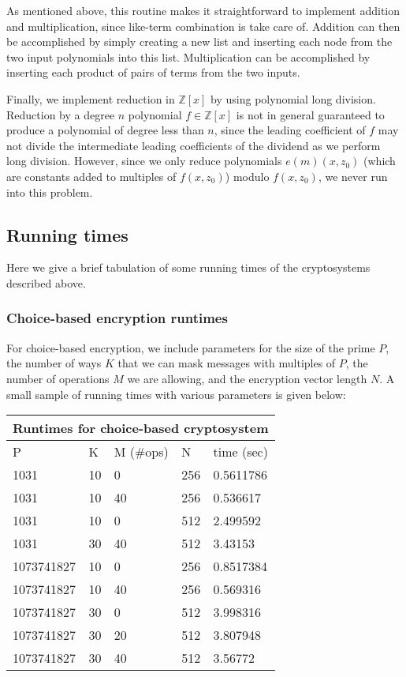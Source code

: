 \documentclass[11pt]{report}
\newcommand{\Zx}{\mathbb{Z}[x]}
\begin{document}
As mentioned above, this routine makes it straightforward to implement addition and multiplication, since like-term combination is take care of. Addition can then be accomplished by simply creating a new list and inserting each node from the two input polynomials into this list. Multiplication can be accomplished by inserting each product of pairs of terms from the two inputs.

Finally, we implement reduction in $\Zx$ by using polynomial long division. Reduction by a degree $n$ polynomial $f\in\Zx$ is not in general guaranteed to produce a polynomial of degree less than $n$, since the leading coefficient of $f$ may not divide the intermediate leading coefficients of the dividend as we perform long division. However, since we only reduce polynomials $e(m)(x,z_0)$ (which are constants added to multiples of $f(x,z_0)$) modulo $f(x,z_0)$, we never run into this problem.

\subsection{Running times}
Here we give a brief tabulation of some running times of the cryptosystems described above.

\subsubsection{Choice-based encryption runtimes} For choice-based encryption, we include parameters for the size of the prime $P$, the number of ways $K$ that we can mask messages with multiples of $P$, the number of operations $M$ we are allowing, and the encryption vector length $N$. A small sample of running times with various parameters is given below:

\begin{center}
\begin{tabular}{|l|l|l|l|l|}
\hline
\multicolumn{5}{|c|}{Runtimes for choice-based cryptosystem} \\
\hline
P & K & M (\#ops) & N & time (sec)\\
\hline
1031 & 10 & 0 & 256 & 0.5611786 \\
\hline
1031 & 10 & 40 & 256 & 0.536617 \\
\hline
1031 & 10 & 0 & 512 & 2.499592 \\
\hline
1031 & 30 & 40 & 512 & 3.43153 \\
\hline
1073741827 & 10 & 0 & 256 & 0.8517384 \\
\hline
1073741827 & 10 & 40 & 256 & 0.569316 \\
\hline
1073741827 & 30 & 0 & 512 & 3.998316 \\
\hline
1073741827 & 30 & 20 & 512 & 3.807948 \\
\hline
1073741827 & 30 & 40 & 512 & 3.56772 \\
\hline
\end{tabular}
\end{center}
\end{document}
